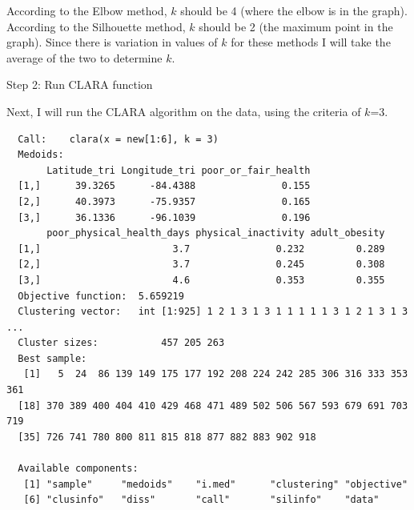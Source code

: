 \documentclass[12pt,twoside]{amherstthesis}
\begin{document}
  According to the Elbow method, \(k\) should be 4 (where the elbow is in
  the graph). According to the Silhouette method, \(k\) should be 2 (the
  maximum point in the graph). Since there is variation in values of \(k\)
  for these methods I will take the average of the two to determine \(k\).
  
  Step 2: Run CLARA function
  
  Next, I will run the CLARA algorithm on the data, using the criteria of
  \(k\)=3.
  
  \begin{Shaded}
  \begin{Highlighting}[]
  \StringTok{ }\NormalTok{(new[}\OperatorTok{:}\NormalTok{], }\NormalTok{)}
  \end{Highlighting}
  \end{Shaded}
  
  \begin{Shaded}
  \begin{Highlighting}[]
  \end{Highlighting}
  \end{Shaded}
  
  \begin{verbatim}
  Call:    clara(x = new[1:6], k = 3) 
  Medoids:
       Latitude_tri Longitude_tri poor_or_fair_health
  [1,]      39.3265      -84.4388               0.155
  [2,]      40.3973      -75.9357               0.165
  [3,]      36.1336      -96.1039               0.196
       poor_physical_health_days physical_inactivity adult_obesity
  [1,]                       3.7               0.232         0.289
  [2,]                       3.7               0.245         0.308
  [3,]                       4.6               0.353         0.355
  Objective function:  5.659219
  Clustering vector:   int [1:925] 1 2 1 3 1 3 1 1 1 1 1 3 1 2 1 3 1 3 ...
  Cluster sizes:           457 205 263 
  Best sample:
   [1]   5  24  86 139 149 175 177 192 208 224 242 285 306 316 333 353 361
  [18] 370 389 400 404 410 429 468 471 489 502 506 567 593 679 691 703 719
  [35] 726 741 780 800 811 815 818 877 882 883 902 918
  
  Available components:
   [1] "sample"     "medoids"    "i.med"      "clustering" "objective" 
   [6] "clusinfo"   "diss"       "call"       "silinfo"    "data"      
  \end{verbatim}
  
\end{document}
